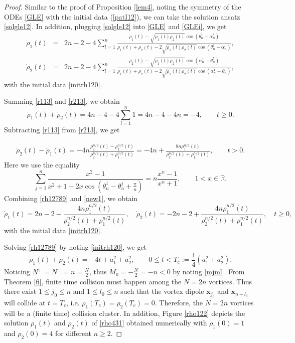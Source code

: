 \documentclass{aims}
\theoremstyle{plain}
\theoremstyle{definition}
\newcommand{\be} {\begin{equation}}
\newcommand{\ee}{\end{equation}}
\newcommand{\bea}{\begin{eqnarray}}
\newcommand{\eea}{\end{eqnarray} }
\begin{document}
\begin{proof} Similar to the proof of
Proposition \ref{lem4}, noting the symmetry of the
ODEs \eqref{GLE} with the initial data (\ref{patI12}),
we can take the solution ansatz \eqref{solgle12}.
In addition, plugging \eqref{solgle12} into \eqref{GLE} and \eqref{GLEi},
we get
\bea\label{r113}
\dot{\rho}_1(t)&=&2n-2-4\sum_{l=1}^n\frac{\rho_1(t)-
\sqrt{\rho_1(t)\rho_2(t)}\cos(\theta_n^1-\alpha_n^{l})}
{\rho_1(t)+\rho_2(t)-2\sqrt{\rho_1(t)\rho_2(t)}\cos(\theta_n^1-\alpha_n^{l})},\\
\label{r213}
\dot{\rho}_2(t)&=&2n-2-4\sum_{l=1}^n
\frac{\rho_2(t)-\sqrt{\rho_1(t)\rho_2(t)}\cos(\alpha_n^{1}-\theta_n^l)}
{\rho_1(t)+\rho_2(t)-2\sqrt{\rho_1(t)\rho_2(t)}\cos(\alpha_n^{1}-\theta_n^l)},
\eea
with the initial data \eqref{initrh120}.


Summing \eqref{r113} and \eqref{r213}, we obtain
\be\label{rh12789}
\dot\rho_1(t)+\dot\rho_2(t)=4n-4
-4\sum_{l=1}^{n}1=4n-4-4n=-4,\qquad t\ge0.
\ee
Subtracting \eqref{r113} from \eqref{r213}, we get

\begin{eqnarray}\label{new1}
\dot\rho_2(t)-\dot \rho_1(t)=-4n\frac{\rho_2^{n/2}(t)-\rho_1^{n/2}(t)}{\rho_2^{n/2}(t)+\rho_1^{n/2}(t)}=
-4n+\frac{8n\rho_1^{n/2}(t)}{\rho_2^{n/2}(t)+\rho_1^{n/2}(t)}, \qquad t>0.
\end{eqnarray}
Here we use the equality
\[\sum_{j=1}^n\frac{x^2-1}{x^2+1-2x
\cos(\theta_n^1-\theta_n^j+\frac{\pi}{n})}=n\frac{x^n-1}{x^n+1}, \qquad 1<x\in {\mathbb R}.
\]
Combining \eqref{rh12789} and \eqref{new1}, we obtain
\be\label{rho431}
\dot\rho_1(t)=2n-2-\frac{4n\rho_1^{n/2}(t)}{\rho_2^{n/2}(t)+\rho_1^{n/2}(t)}, \quad \dot\rho_2(t)=-2n-2+\frac{4n\rho_1^{n/2}(t)}{\rho_2^{n/2}(t)+\rho_1^{n/2}(t)}, \quad t\ge0,
\ee
with the initial data \eqref{initrh120}.






Solving \eqref{rh12789} by noting \eqref{initrh120}, we get
\begin{equation*}\label{p11}
\rho_1(t)+\rho_2(t)=-4t+a_1^2+a_2^2, \qquad 0\le t<T_c:=\frac{1}{4}(a_1^2+a_2^2).
\end{equation*}
Noticing $N^+=N^-=n=\frac{N}{2}$, thus $M_0=-\frac{N}{2}=-n<0$ by noting
\eqref{mjml}. From Theorem \ref{fi}, finite time collision
must happen among the $N=2n$ vortices. Thus
there exist $1\leq j_0\leq n$ and $1\leq l_0\leq
n$ such that the vortex dipole $\mathbf x_{j_0}$ and $\mathbf
x_{n+l_0}$ will collide at $t=T_c$, i.e. $\rho_1(T_c)=\rho_2(T_c)=0$.
Therefore, the $N=2n$ vortices will be a (finite time) collision cluster.
In addition,
Figure \ref{rho122} depicts the solution
$\rho_1(t)$ and $\rho_2(t)$ of \eqref{rho431} obtained numerically with $\rho_1(0)=1$ and $\rho_2(0)=4$ for different $n\ge2$.
\end{proof}
\end{document}
